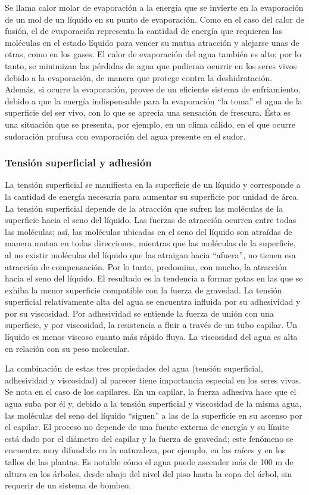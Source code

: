 Se llama calor molar de evaporación a la energía que se invierte en la evaporación de un mol de un líquido en su punto de evaporación. Como en el caso del calor de fusión, el de evaporación representa la cantidad de energía que requieren las moléculas en el estado líquido para vencer su mutua atracción y alejarse unas de otras, como en los gases. El calor de evaporación del agua también es alto; por lo tanto, se minimizan las pérdidas de agua que pudieran ocurrir en los seres vivos debido a la evaporación, de manera que protege contra la deshidratación. Además, si ocurre la evaporación, provee de un eficiente sistema de enfriamiento, debido a que la energía indispensable para la evaporación “la toma” el agua de la superficie del ser vivo, con lo que se aprecia una sensación de frescura. Ésta es una situación que se presenta, por ejemplo, en un clima cálido, en el que ocurre sudoración profusa con evaporación del agua presente en el sudor.

\subsubsection{Tensión superficial y adhesión}

La tensión superficial se manifiesta en la superficie de un líquido y corresponde a la cantidad de energía necesaria para aumentar su superficie por unidad de área. La tensión superficial depende de la atracción que sufren las moléculas de la superficie hacia el seno del líquido. Las fuerzas de atracción ocurren entre todas las moléculas; así, las moléculas ubicadas en el seno del líquido son atraídas de manera mutua en todas direcciones, mientras que las moléculas de la superficie, al no existir moléculas del líquido que las atraigan hacia “afuera”, no tienen esa atracción de compensación. Por lo tanto, predomina, con mucho, la atracción hacia el seno del líquido. El resultado es la tendencia a formar gotas en las que se exhiba la menor superficie compatible con la fuerza de gravedad. La tensión superficial relativamente alta del agua se encuentra influida por su adhesividad y por su viscosidad. Por adhesividad se entiende la fuerza de unión con una superficie, y por viscosidad, la resistencia a fluir a través de un tubo capilar. Un líquido es menos viscoso cuanto más rápido fluya. La viscosidad del agua es alta en relación con su peso molecular.


La combinación de estas tres propiedades del agua (tensión superficial, adhesividad y
viscosidad) al parecer tiene importancia especial en los seres vivos. Se nota en el caso de
los capilares. En un capilar, la fuerza adhesiva hace que el agua suba por él y, debido a la
tensión superficial y viscosidad de la misma agua, las moléculas del seno del líquido
“siguen” a las de la superficie en su ascenso por el capilar. El proceso no depende de una
fuente externa de energía y su límite está dado por el diámetro del capilar y la fuerza de
gravedad; este fenómeno se encuentra muy difundido en la naturaleza, por ejemplo, en
las raíces y en los tallos de las plantas. Es notable cómo el agua puede ascender más de
100 m de altura en los árboles, desde abajo del nivel del piso hasta la copa del árbol, sin
requerir de un sistema de bombeo.

